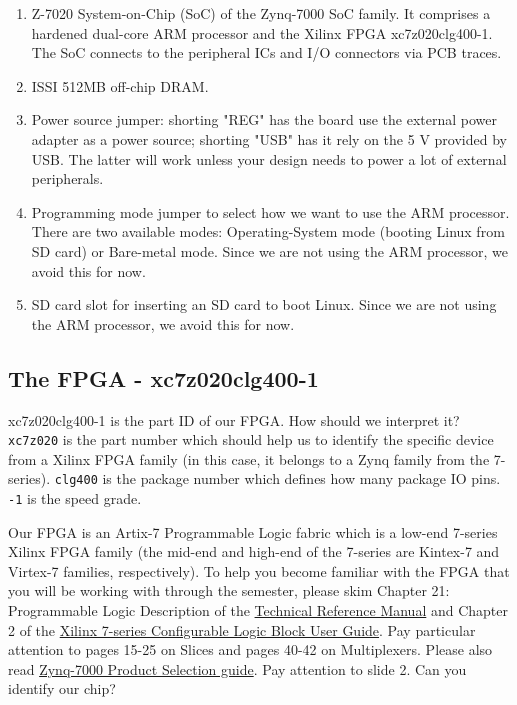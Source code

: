 \documentclass[11pt]{article}
\begin{document}
\begin{enumerate}
  \item Z-7020 System-on-Chip (SoC) of the Zynq-7000 SoC family. It comprises a hardened dual-core ARM processor and the Xilinx FPGA xc7z020clg400-1. The SoC connects to the peripheral ICs and I/O connectors via PCB traces.
  \item ISSI 512MB off-chip DRAM.
  \item Power source jumper: shorting "REG" has the board use the external power adapter as a power source; shorting "USB" has it rely on the 5 V provided by USB. The latter will work unless your design needs to power a lot of external peripherals.
  \item Programming mode jumper to select how we want to use the ARM processor. There are two available modes: Operating-System mode (booting Linux from SD card) or Bare-metal mode. Since we are not using the ARM processor, we avoid this for now.
  \item SD card slot for inserting an SD card to boot Linux. Since we are not using the ARM processor, we avoid this for now.
\end{enumerate}

\subsection{The FPGA - xc7z020clg400-1}

xc7z020clg400-1 is the part ID of our FPGA. How should we interpret it? \texttt{xc7z020} is the part number which should help us to identify the specific device from a Xilinx FPGA family (in this case, it belongs to a Zynq family from the 7-series). \texttt{clg400} is the package number which defines how many package IO pins. \texttt{-1} is the speed grade.

Our FPGA is an Artix-7 Programmable Logic fabric which is a low-end 7-series Xilinx FPGA family (the mid-end and high-end of the 7-series are Kintex-7 and Virtex-7 families, respectively).
To help you become familiar with the FPGA that you will be working with through the semester, please skim Chapter 21: Programmable Logic Description of the \href{https://www.xilinx.com/support/documentation/user_guides/ug585-Zynq-7000-TRM.pdf}{Technical Reference Manual} and Chapter 2 of the \href{http://www.xilinx.com/support/documentation/user_guides/ug474_7Series_CLB.pdf}{Xilinx 7-series Configurable Logic Block User Guide}.
Pay particular attention to pages 15-25 on Slices and pages 40-42 on Multiplexers.
Please also read \href{https://www.xilinx.com/support/documentation/selection-guides/zynq-7000-product-selection-guide.pdf}{Zynq-7000 Product Selection guide}. Pay attention to slide 2. Can you identify our chip?
\end{document}

